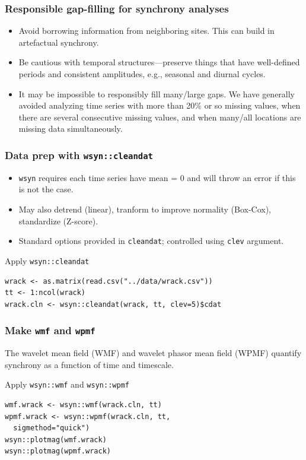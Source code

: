 \documentclass{beamer}
\begin{document}
\begin{frame}
\frametitle{Responsible gap-filling for synchrony analyses}
\begin{itemize}
\item Avoid borrowing information from neighboring sites. This can build in artefactual synchrony.
\item Be cautious with temporal structures---preserve things that have well-defined periods and consistent amplitudes, e.g., seasonal and diurnal cycles.
\item It may be impossible to responsibly fill many/large gaps. We have generally avoided analyzing time series with more than 20\% or so missing values, when there are several consecutive missing values, and when many/all locations are missing data simultaneously.
\end{itemize}
\end{frame}

\begin{frame}[fragile]
\frametitle{Data prep with \texttt{wsyn::cleandat}}
\begin{itemize}
\item \texttt{wsyn} requires each time series have mean = 0 and will throw an error if this is not the case.
\item May also detrend (linear), tranform to improve normality (Box-Cox), standardize (Z-score). 
\item Standard options provided in \texttt{cleandat}; controlled using \texttt{clev} argument.
\end{itemize}
\begin{exampleblock}{Apply \texttt{wsyn::cleandat}}
\begin{verbatim}
wrack <- as.matrix(read.csv("../data/wrack.csv"))
tt <- 1:ncol(wrack)
wrack.cln <- wsyn::cleandat(wrack, tt, clev=5)$cdat 
\end{verbatim}
\end{exampleblock}
\end{frame}

\begin{frame}[fragile]
\frametitle{Make \texttt{wmf} and \texttt{wpmf}}
The wavelet mean field (WMF) and wavelet phasor mean field (WPMF) quantify synchrony as a function of time and timescale.
\begin{exampleblock}{Apply \texttt{wsyn::wmf} and \texttt{wsyn::wpmf}}
\begin{verbatim}
wmf.wrack <- wsyn::wmf(wrack.cln, tt)
wpmf.wrack <- wsyn::wpmf(wrack.cln, tt, 
  sigmethod="quick")
wsyn::plotmag(wmf.wrack)
wsyn::plotmag(wpmf.wrack)
\end{verbatim}
\end{exampleblock}
\end{frame}
\end{document}
